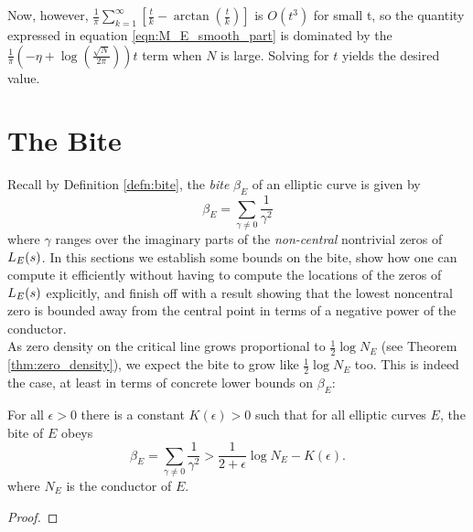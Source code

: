 Now, however, $\frac{1}{\pi}\sum_{k=1}^{\infty} \left[\frac{t}{k} - \arctan\left(\frac{t}{k}\right)\right]$ is $O(t^3)$ for small t, so the quantity expressed in equation \ref{eqn:M_E_smooth_part} is dominated by the $\frac{1}{\pi}\left(-\eta+\log\left(\frac{\sqrt{N}}{2\pi}\right)\right) t$ term when $N$ is large. Solving for $t$ yields the desired value.

\newpage
\section{The Bite}

Recall by Definition \ref{defn:bite}, the {\it bite} $\beta_E$ of an elliptic curve is given by
\begin{equation}
\beta_E = \sum_{\gamma \ne 0} \frac{1}{\gamma^2}
\end{equation}
where $\gamma$ ranges over the imaginary parts of the {\it non-central} nontrivial zeros of $L_E(s)$. In this sections we establish some bounds on the bite, show how one can compute it efficiently without having to compute the locations of the zeros of $L_E(s)$ explicitly, and finish off with a result showing that the lowest noncentral zero is bounded away from the central point in terms of a negative power of the conductor. \\


As zero density on the critical line grows proportional to $\frac{1}{2}\log N_E$ (see Theorem \ref{thm:zero_density}), we expect the bite to grow like $\frac{1}{2}\log N_E$ too. This is indeed the case, at least in terms of concrete lower bounds on $\beta_E$:
\begin{lemma}[S.]
For all $\epsilon>0$ there is a constant $K(\epsilon)>0$ such that for all elliptic curves $E$, the bite of $E$ obeys
\begin{equation}
\beta_E = \sum_{\gamma\ne 0} \frac{1}{\gamma^2} > \frac{1}{2+\epsilon} \log N_E - K(\epsilon).
\end{equation}
where $N_E$ is the conductor of $E$.
\end{lemma}
\begin{proof}

\end{proof}

